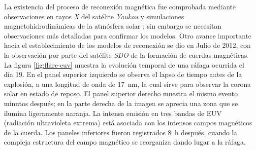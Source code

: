 La existencia del proceso de reconexión magnética fue comprobada mediante observaciones en rayos \emph{X} del satélite \emph{Youkou} \cite{masuda,tsuneta} y simulaciones magnetohidrodinámicas de la atmósfera solar  \cite{yokoyama}; sin embargo se necesitan observaciones más detalladas para confirmar los modelos. Otro avance importante hacia el establecimiento de los modelos de reconexión se dio en Julio de \num{2012}, con la observación por parte del satélite \emph{SDO} de la formación de cuerdas magnéticas. La figura \ref{fig:flare-euv} muestra la evolución temporal de una ráfaga ocurrida el dia \num{19}. En el panel superior izquierdo se observa el lapso de tiempo antes de la explosión, a una longitud de onda de \SI{17}{\nano\metre}, la cual sirve para observar la corona solar en estado de reposo. El panel superior derecho muestra el mismo evento minutos después; en la parte derecha de la imagen se aprecia una zona que se ilumina ligeramente naranja. La intensa emisión en tres bandas de EUV (radiación ultravioleta extrema) está asociada con los intensos campos magnéticos de la cuerda. Los paneles inferiores fueron registrados \SI{8}{\hour} después, cuando la compleja estructura del campo magnético se reorganiza dando lugar a la ráfaga.

